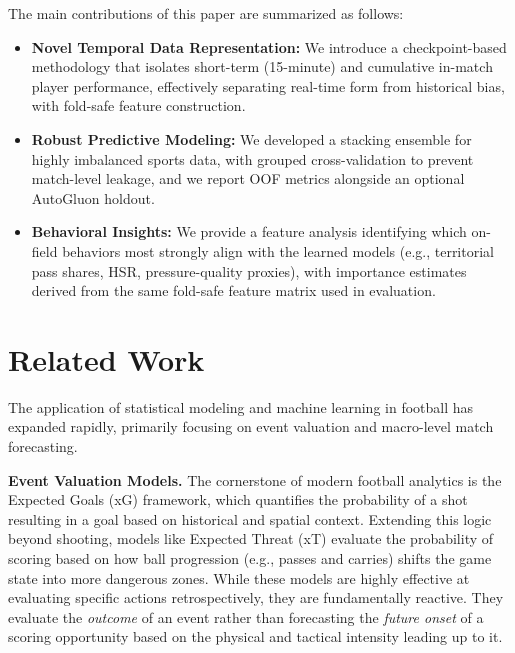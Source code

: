 \documentclass[11pt, a4paper]{article}
\begin{document}
The main contributions of this paper are summarized as follows:
\begin{itemize}
    \item \textbf{Novel Temporal Data Representation:} We introduce a checkpoint-based methodology that isolates short-term (15-minute) and cumulative in-match player performance, effectively separating real-time form from historical bias, with fold-safe feature construction.
    \item \textbf{Robust Predictive Modeling:} We developed a stacking ensemble for highly imbalanced sports data, with grouped cross-validation to prevent match-level leakage, and we report OOF metrics alongside an optional AutoGluon holdout.
    \item \textbf{Behavioral Insights:} We provide a feature analysis identifying which on-field behaviors most strongly align with the learned models (e.g., territorial pass shares, HSR, pressure-quality proxies), with importance estimates derived from the same fold-safe feature matrix used in evaluation.
\end{itemize}

\section{Related Work}

The application of statistical modeling and machine learning in football has expanded rapidly, primarily focusing on event valuation and macro-level match forecasting. 

\textbf{Event Valuation Models.} The cornerstone of modern football analytics is the Expected Goals (xG) framework, which quantifies the probability of a shot resulting in a goal based on historical and spatial context. Extending this logic beyond shooting, models like Expected Threat (xT) \cite{singh2019xt} evaluate the probability of scoring based on how ball progression (e.g., passes and carries) shifts the game state into more dangerous zones. While these models are highly effective at evaluating specific actions retrospectively, they are fundamentally reactive. They evaluate the \textit{outcome} of an event rather than forecasting the \textit{future onset} of a scoring opportunity based on the physical and tactical intensity leading up to it.
\end{document}
